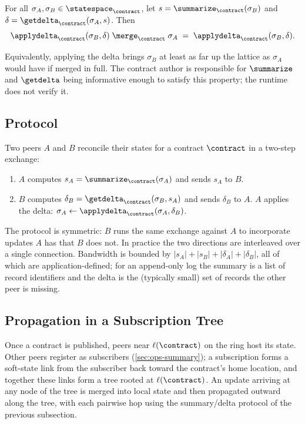 \begin{property}
\label{prop:sync}
For all $\sigma_A, \sigma_B \in \statespace_\contract$, let $s = \summarize_\contract(\sigma_B)$ and $\delta = \getdelta_\contract(\sigma_A, s)$. Then
\[
  \applydelta_\contract(\sigma_B, \delta) \;\merge_\contract\; \sigma_A
  \;=\;
  \applydelta_\contract(\sigma_B, \delta).
\]
\end{property}

\noindent Equivalently, applying the delta brings $\sigma_B$ at least as far up the lattice as $\sigma_A$ would have if merged in full. The contract author is responsible for $\summarize$ and $\getdelta$ being informative enough to satisfy this property; the runtime does not verify it.

\subsection{Protocol}

Two peers $A$ and $B$ reconcile their states for a contract $\contract$ in a two-step exchange:

\begin{enumerate}[leftmargin=*, itemsep=2pt]
  \item $A$ computes $s_A = \summarize_\contract(\sigma_A)$ and sends $s_A$ to $B$.
  \item $B$ computes $\delta_B = \getdelta_\contract(\sigma_B, s_A)$ and sends $\delta_B$ to $A$. $A$ applies the delta: $\sigma_A \gets \applydelta_\contract(\sigma_A, \delta_B)$.
\end{enumerate}

The protocol is symmetric: $B$ runs the same exchange against $A$ to incorporate updates $A$ has that $B$ does not. In practice the two directions are interleaved over a single connection. Bandwidth is bounded by $|s_A| + |s_B| + |\delta_A| + |\delta_B|$, all of which are application-defined; for an append-only log the summary is a list of record identifiers and the delta is the (typically small) set of records the other peer is missing.

\subsection{Propagation in a Subscription Tree}
\label{sec:subscription-tree}

Once a contract is published, peers near $\ell(\contract)$ on the ring host its state. Other peers register as subscribers (\cref{sec:ops-summary}); a subscription forms a soft-state link from the subscriber back toward the contract's home location, and together these links form a tree rooted at $\ell(\contract)$. An update arriving at any node of the tree is merged into local state and then propagated outward along the tree, with each pairwise hop using the summary/delta protocol of the previous subsection.

